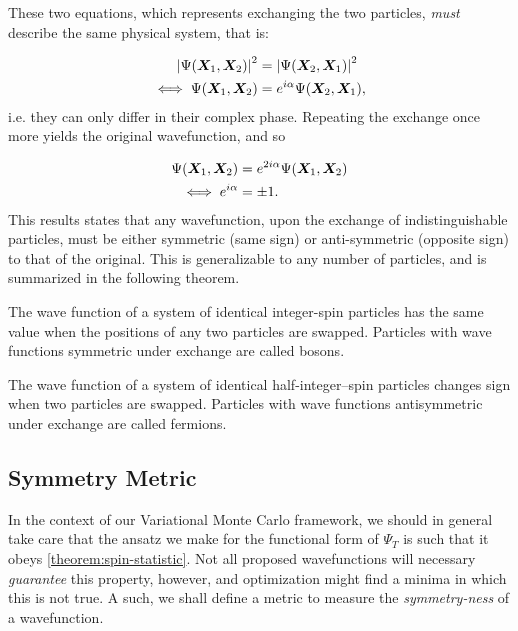 \documentclass[Thesis.tex]{subfiles}
\begin{document}
These two equations, which represents exchanging the two particles, \emph{must}
describe the same physical system, that is:

\begin{align}
    \abs{\Psi(\bm{X}_1, \bm{X}_2)}^2 &= \abs{\Psi(\bm{X}_2, \bm{X}_1)}^2\\
    \iff \Psi(\bm{X}_1,\bm{X}_2) &= e^{i\alpha}\Psi(\bm{X}_2, \bm{X}_1),
\end{align}
i.e. they can only differ in their complex phase. Repeating the exchange once
more yields the original wavefunction, and so

\begin{align}
    \Psi(\bm{X}_1,\bm{X}_2) &= e^{2i\alpha}\Psi(\bm{X}_1, \bm{X}_2)\\
    \iff e^{i\alpha} &= \pm 1.
\end{align}
This results states that any wavefunction, upon the exchange of
indistinguishable particles, must be either symmetric (same sign) or
anti-symmetric (opposite sign) to that of the original. This is generalizable to
any number of particles, and is summarized in the following theorem.

\begin{theorem}\label{theorem:spin-statistic}

The wave function of a system of identical integer-spin particles
has the same value when the positions of any two particles are
swapped. Particles with wave functions symmetric under exchange are
called bosons.

The wave function of a system of identical half-integer–spin particles changes sign when two particles are swapped. Particles with wave functions antisymmetric under exchange are called fermions.
\end{theorem}

\subsection{Symmetry Metric}

In the context of our Variational Monte Carlo framework, we should in general
take care that the ansatz we make for the functional form of $\Psi_T$ is such
that it obeys \autoref{theorem:spin-statistic}. Not all proposed wavefunctions
will necessary \emph{guarantee} this property, however, and optimization might
find a minima in which this is not true. A such, we shall define a metric to
measure the \emph{symmetry-ness} of a wavefunction.
\end{document}
